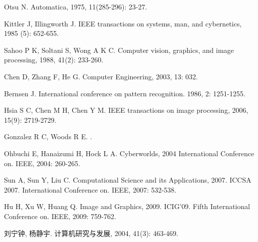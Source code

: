 \begin{thebibliography}{99} %
		
		Otsu N.  
		\newblock Automatica, 1975, 11(285-296): 23-27.
		
		Kittler J, Illingworth J. 
		\newblock IEEE transactions on systems, man, and cybernetics, 1985 (5): 652-655.
		
		Sahoo P K, Soltani S, Wong A K C. 
		\newblock Computer vision, graphics, and image processing, 1988, 41(2): 233-260.
		
		Chen D, Zhang F, He G. 
		\newblock Computer Engineering, 2003, 13: 032.
		
		Bernsen J.
		\newblock International conference on pattern recognition. 1986, 2: 1251-1255.
		
		Hsia S C, Chen M H, Chen Y M. 
		\newblock IEEE transactions on image processing, 2006, 15(9): 2719-2729.
		
		Gonzalez R C, Woods R E. 
		.
		
		Ohbuchi E, Hanaizumi H, Hock L A. 
		\newblock Cyberworlds, 2004 International Conference on. IEEE, 2004: 260-265.
		
		Sun A, Sun Y, Liu C.
		\newblock Computational Science and its Applications, 2007. ICCSA 2007. International Conference on. IEEE, 2007: 532-538.
		
		Hu H, Xu W, Huang Q.
		\newblock Image and Graphics, 2009. ICIG'09. Fifth International Conference on. IEEE, 2009: 759-762.
		
		刘宁钟, 杨静宇. 
		\newblock 计算机研究与发展, 2004, 41(3): 463-469.
		

\end{thebibliography}
